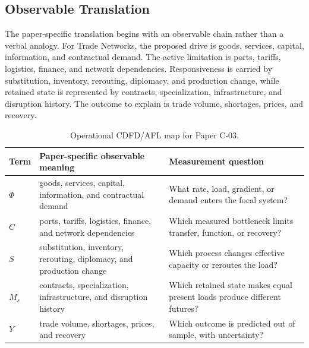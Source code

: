 \documentclass[11pt,a4paper]{article}
\begin{document}
\subsection{Observable Translation}

The paper-specific translation begins with an observable chain rather than a
verbal analogy. For Trade Networks, the proposed drive is goods, services, capital, information, and contractual demand.
The active limitation is ports, tariffs, logistics, finance, and network dependencies. Responsiveness is carried by
substitution, inventory, rerouting, diplomacy, and production change, while retained state is represented by
contracts, specialization, infrastructure, and disruption history. The outcome to explain is trade volume, shortages, prices, and recovery.

\begin{table}[htbp]
\centering
\small
\caption{Operational CDFD/AFL map for Paper C-03.}
\begin{tabularx}{\textwidth}{|l|X|X|}
\hline
\textbf{Term} & \textbf{Paper-specific observable meaning} & \textbf{Measurement question} \\
\hline
$\Phi$ & goods, services, capital, information, and contractual demand & What rate, load, gradient, or demand enters the focal system? \\
\hline
$C$ & ports, tariffs, logistics, finance, and network dependencies & Which measured bottleneck limits transfer, function, or recovery? \\
\hline
$S$ & substitution, inventory, rerouting, diplomacy, and production change & Which process changes effective capacity or reroutes the load? \\
\hline
$M_s$ & contracts, specialization, infrastructure, and disruption history & Which retained state makes equal present loads produce different futures? \\
\hline
$Y$ & trade volume, shortages, prices, and recovery & Which outcome is predicted out of sample, with uncertainty? \\
\hline
\end{tabularx}
\end{table}
\end{document}
